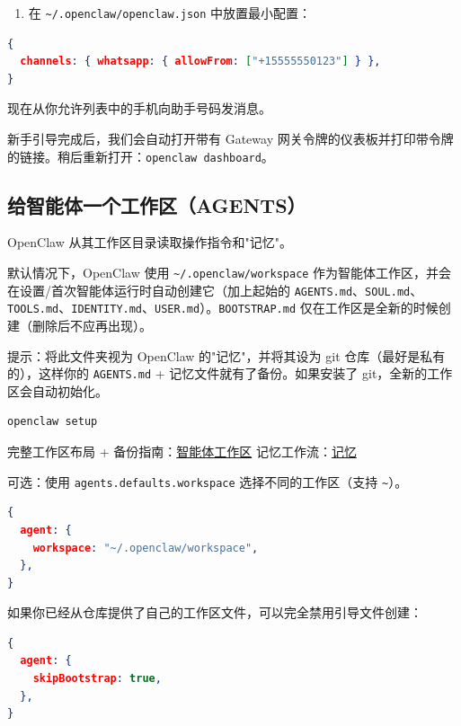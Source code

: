\begin{enumerate}
  \item 在 \texttt{\textasciitilde{}/.openclaw/openclaw.json} 中放置最小配置：
\end{enumerate}


\begin{lstlisting}[language=json]
{
  channels: { whatsapp: { allowFrom: ["+15555550123"] } },
}
\end{lstlisting}


现在从你允许列表中的手机向助手号码发消息。

新手引导完成后，我们会自动打开带有 Gateway 网关令牌的仪表板并打印带令牌的链接。稍后重新打开：\texttt{openclaw dashboard}。

\subsection{给智能体一个工作区（AGENTS）}


OpenClaw 从其工作区目录读取操作指令和"记忆"。

默认情况下，OpenClaw 使用 \texttt{\textasciitilde{}/.openclaw/workspace} 作为智能体工作区，并会在设置/首次智能体运行时自动创建它（加上起始的 \texttt{AGENTS.md}、\texttt{SOUL.md}、\texttt{TOOLS.md}、\texttt{IDENTITY.md}、\texttt{USER.md}）。\texttt{BOOTSTRAP.md} 仅在工作区是全新的时候创建（删除后不应再出现）。

提示：将此文件夹视为 OpenClaw 的"记忆"，并将其设为 git 仓库（最好是私有的），这样你的 \texttt{AGENTS.md} + 记忆文件就有了备份。如果安装了 git，全新的工作区会自动初始化。

\begin{lstlisting}[language=bash]
openclaw setup
\end{lstlisting}


完整工作区布局 + 备份指南：\href{/concepts/agent-workspace}{智能体工作区}
记忆工作流：\href{/concepts/memory}{记忆}

可选：使用 \texttt{agents.defaults.workspace} 选择不同的工作区（支持 \texttt{\textasciitilde{}}）。

\begin{lstlisting}[language=json]
{
  agent: {
    workspace: "~/.openclaw/workspace",
  },
}
\end{lstlisting}


如果你已经从仓库提供了自己的工作区文件，可以完全禁用引导文件创建：

\begin{lstlisting}[language=json]
{
  agent: {
    skipBootstrap: true,
  },
}
\end{lstlisting}


